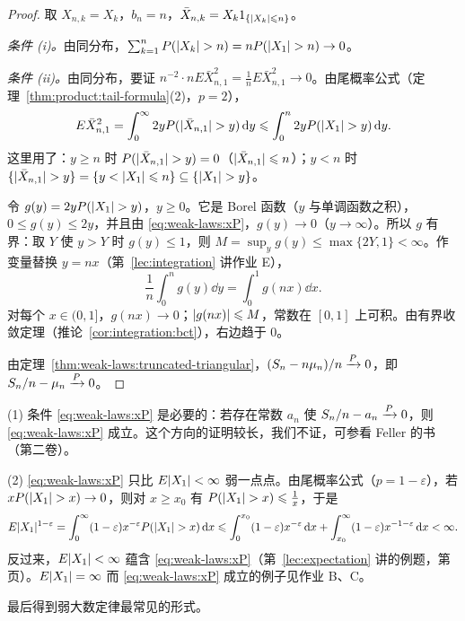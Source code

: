 \begin{proof}
取 $X_{n,k}=X_k$，$b_n=n$，$\bar X_{n,k}=X_k1_{\{\lvert X_k\rvert\leqslant n\}}$。

\emph{条件 (i)。}由同分布，$\sum_{k=1}^nP(\lvert X_k\rvert>n)=nP(\lvert X_1\rvert>n)\to0$。

\emph{条件 (ii)。}由同分布，要证 $n^{-2}\cdot nE\bar X_{n,1}^2=\frac1nE\bar X_{n,1}^2\to0$。由尾概率公式（定理~\ref{thm:product:tail-formula}(2)，$p=2$），
\[
E\bar X_{n,1}^2=\int_0^\infty2yP(\lvert \bar X_{n,1}\rvert>y)\,\mathrm{d} y\leqslant\int_0^n2yP(\lvert X_1\rvert>y)\,\mathrm{d} y .
\]
这里用了：$y\geqslant n$ 时 $P(\lvert \bar X_{n,1}\rvert>y)=0$（$\lvert \bar X_{n,1}\rvert\leqslant n$）；$y<n$ 时 $\{\lvert \bar X_{n,1}\rvert>y\}=\{y<\lvert X_1\rvert\leqslant n\}\subseteq\{\lvert X_1\rvert>y\}$。

令 $g(y)=2yP(\lvert X_1\rvert>y)$，$y\geqslant0$。它是 Borel 函数（$y$ 与单调函数之积），$0\leqslant g(y)\leqslant2y$，并且由 \eqref{eq:weak-laws:xP}，$g(y)\to0$（$y\to\infty$）。所以 $g$ 有界：取 $Y$ 使 $y>Y$ 时 $g(y)\leqslant1$，则 $M=\sup_yg(y)\leqslant\max\{2Y,1\}<\infty$。作变量替换 $y=nx$（第~\ref{lec:integration} 讲作业 E），
\[
\frac1n\int_0^ng(y)\dd y=\int_0^1g(nx)\dd x .
\]
对每个 $x\in(0,1]$，$g(nx)\to0$；$\lvert g(nx)\rvert\leqslant M$，常数在 $[0,1]$ 上可积。由有界收敛定理（推论~\ref{cor:integration:bct}），右边趋于 $0$。

由定理~\ref{thm:weak-laws:truncated-triangular}，$(S_n-n\mu_n)/n\xrightarrow{P}0$，即 $S_n/n-\mu_n\xrightarrow{P}0$。
\end{proof}

\begin{remark}
(1) 条件 \eqref{eq:weak-laws:xP} 是必要的：若存在常数 $a_n$ 使 $S_n/n-a_n\xrightarrow{P}0$，则 \eqref{eq:weak-laws:xP} 成立。这个方向的证明较长，我们不证，可参看 Feller 的书（第二卷）。

(2) \eqref{eq:weak-laws:xP} 只比 $E\lvert X_1\rvert<\infty$ 弱一点点。由尾概率公式（$p=1-\varepsilon$），若 $xP(\lvert X_1\rvert>x)\to0$，则对 $x\geqslant x_0$ 有 $P(\lvert X_1\rvert>x)\leqslant\frac1x$，于是
\[
E\lvert X_1\rvert^{1-\varepsilon}=\int_0^\infty(1-\varepsilon)x^{-\varepsilon}P(\lvert X_1\rvert>x)\,\mathrm{d} x\leqslant\int_0^{x_0}(1-\varepsilon)x^{-\varepsilon}\,\mathrm{d} x+\int_{x_0}^\infty(1-\varepsilon)x^{-1-\varepsilon}\,\mathrm{d} x<\infty .
\]
反过来，$E\lvert X_1\rvert<\infty$ 蕴含 \eqref{eq:weak-laws:xP}（第~\ref{lec:expectation} 讲的例题，第~\pageref{we:expectation:tP} 页）。$E\lvert X_1\rvert=\infty$ 而 \eqref{eq:weak-laws:xP} 成立的例子见作业 B、C。
\end{remark}

最后得到弱大数定律最常见的形式。

